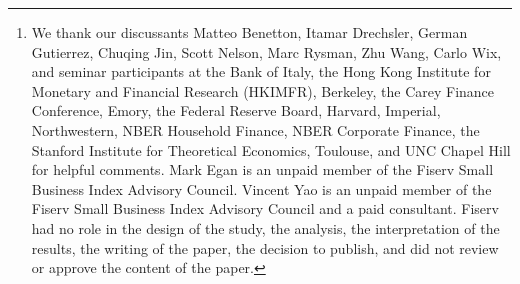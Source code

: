 \documentclass[11pt,english]{article}
\begin{document}
\date{\today\thanks{We thank our discussants Matteo Benetton, Itamar Drechsler, German Gutierrez, Chuqing Jin, Scott Nelson, Marc Rysman, Zhu Wang, Carlo Wix, and seminar participants at the Bank of Italy, the Hong Kong Institute for Monetary and Financial Research (HKIMFR), Berkeley, the Carey Finance Conference, Emory, the Federal Reserve Board, Harvard, Imperial, Northwestern, NBER Household Finance, NBER Corporate Finance, the Stanford Institute for Theoretical Economics, Toulouse, and UNC Chapel Hill for helpful comments. Mark Egan is an unpaid member of the Fiserv Small Business Index Advisory Council. Vincent Yao is an unpaid member of the Fiserv Small Business Index Advisory Council and a paid consultant. Fiserv had no role in the design of the study, the analysis, the interpretation of the results, the writing of the paper, the decision to publish, and did not review or approve the content of the paper. }}

\maketitle


 \thispagestyle{empty} 
\end{document}

